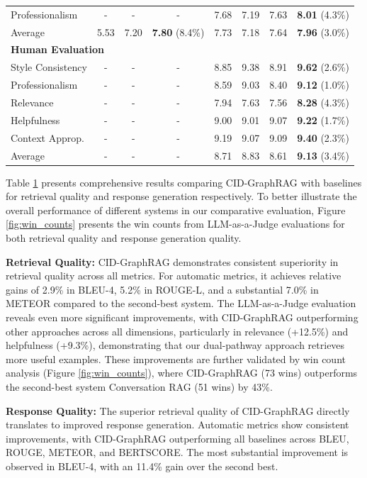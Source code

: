 \documentclass[
]{style/ceurart}
\begin{document}
\begin{table}[t]
\begin{tabular}{@{}l@{\hspace{3pt}}@{\hspace{3pt}}ccc@{\hspace{3pt}}@{\hspace{3pt}}cccc@{}}
Professionalism & - & - & - & 7.68 & 7.19 & 7.63 & \textbf{8.01} (4.3\%) \\
Average & 5.53 & 7.20 & \textbf{7.80} (8.4\%) & 7.73 & 7.18 & 7.64 & \textbf{7.96} (3.0\%) \\
\midrule
\multicolumn{8}{l}{\textbf{Human Evaluation}} \\
\midrule
Style Consistency & - & - & - & 8.85 & 9.38 & 8.91 & \textbf{9.62} (2.6\%) \\
Professionalism & - & - & - & 8.59 & 9.03 & 8.40 & \textbf{9.12} (1.0\%) \\
Relevance & - & - & - & 7.94 & 7.63 & 7.56 & \textbf{8.28} (4.3\%) \\
Helpfulness & - & - & - & 9.00 & 9.01 & 9.07 & \textbf{9.22} (1.7\%) \\
Context Approp. & - & - & - & 9.19 & 9.07 & 9.09 & \textbf{9.40} (2.3\%) \\
Average & - & - & - & 8.71 & 8.83 & 8.61 & \textbf{9.13} (3.4\%) \\
\bottomrule
\end{tabular}
\label{tab:comprehensive_results}
\end{table}

Table \ref{tab:comprehensive_results} presents comprehensive results comparing CID-GraphRAG with baselines for retrieval quality and response generation respectively. To better illustrate the overall performance of different systems in our comparative evaluation, Figure \ref{fig:win_counts} presents the win counts from LLM-as-a-Judge evaluations for both retrieval quality and response generation quality.

\textbf{Retrieval Quality:} CID-GraphRAG demonstrates consistent superiority in retrieval quality across all metrics. For automatic metrics, it achieves relative gains of 2.9\% in BLEU-4, 5.2\% in ROUGE-L, and a substantial 7.0\% in METEOR compared to the second-best system. The LLM-as-a-Judge evaluation reveals even more significant improvements, with CID-GraphRAG outperforming other approaches across all dimensions, particularly in relevance (+12.5\%) and helpfulness (+9.3\%), demonstrating that our dual-pathway approach retrieves more useful examples. These improvements are further validated by win count analysis (Figure \ref{fig:win_counts}), where CID-GraphRAG (73 wins) outperforms the second-best system Conversation RAG (51 wins) by 43\%.

\textbf{Response Quality:} The superior retrieval quality of CID-GraphRAG directly translates to improved response generation. Automatic metrics show consistent improvements, with CID-GraphRAG outperforming all baselines across BLEU, ROUGE, METEOR, and BERTSCORE. The most substantial improvement is observed in BLEU-4, with an 11.4\% gain over the second best.
\end{document}
